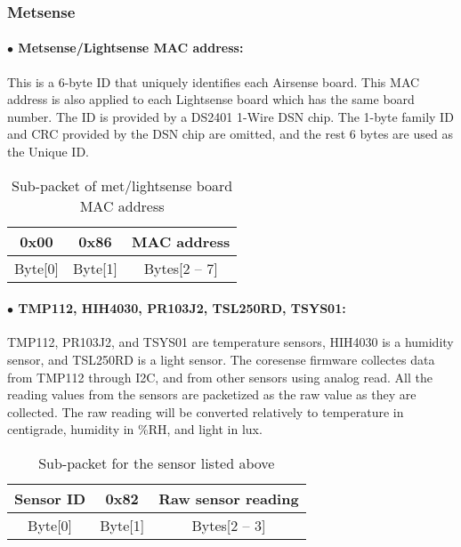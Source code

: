 
\subsubsection{Metsense}

\paragraph{$\bullet$ Metsense/Lightsense MAC address: }

This is a 6-byte ID that uniquely identifies each Airsense board. This MAC address is also applied to each Lightsense board which has the same board number. The ID is provided by a DS2401 1-Wire DSN chip. The 1-byte family ID and CRC provided by the DSN chip are omitted, and the rest 6 bytes are used as the Unique ID.


\begin{table}[h!]
    \centering
    \caption{Sub-packet of met/lightsense board MAC address}
    \begin{tabular}{|c|c|c|}
        \hline
        \rowcolor{black!8}
        \textbf{0x00} & \textbf{0x86} & \textbf{MAC address} \\
        \hline
        Byte[0] & Byte[1] & Bytes[2 -- 7]\\ \hline
    \end{tabular}
\end{table}
\par

\paragraph{$\bullet$ TMP112, HIH4030, PR103J2, TSL250RD, TSYS01:}

TMP112, PR103J2, and TSYS01 are temperature sensors, HIH4030 is a humidity sensor, and TSL250RD is a light sensor.
The coresense firmware collectes data from TMP112 through I2C, and from other sensors using analog read.
All the reading values from the sensors are packetized as the raw value as they are collected.
The raw reading will be converted relatively to temperature in centigrade, humidity in \%RH, and light in lux.

\begin{table}[h!]
    \centering
    \caption{Sub-packet for the sensor listed above}
    \begin{tabular}{|c|c|c|}
        \hline
        \rowcolor{black!8}
        \textbf{Sensor ID} & \textbf{0x82} & \textbf{Raw sensor reading} \\
        \hline
        Byte[0] & Byte[1] & Bytes[2 -- 3]\\ \hline
    \end{tabular}
\end{table}


